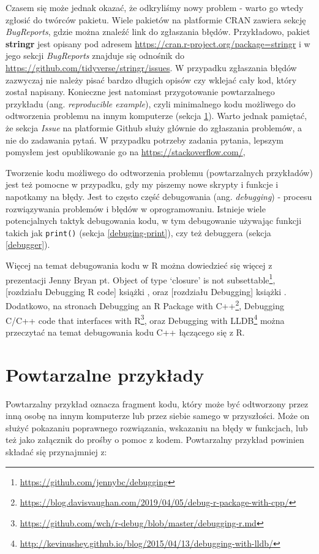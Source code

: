 \documentclass[paper=6in:9in,pagesize=pdftex,headinclude=on,footinclude=on,10pt]{scrbook}
\DeclareRobustCommand{\href}[2]{#2\footnote{\url{#1}}}
\begin{document}
Czasem się może jednak okazać, że odkryliśmy nowy problem - warto go wtedy zgłosić do twórców pakietu.
Wiele pakietów na platformie CRAN zawiera sekcję \emph{BugReports}, gdzie można znaleźć link do zgłaszania błędów.
Przykładowo, pakiet \textbf{stringr} jest opisany pod adresem \url{https://cran.r-project.org/package=stringr} i w jego sekcji \emph{BugReports} znajduje się odnośnik do \url{https://github.com/tidyverse/stringr/issues}.
W przypadku zgłaszania błędów zazwyczaj nie należy pisać bardzo długich opisów czy wklejać cały kod, który został napisany.
Konieczne jest natomiast przygotowanie powtarzalnego przykładu (ang. \emph{reproducible example}), czyli minimalnego kodu możliwego do odtworzenia problemu na innym komputerze (sekcja \ref{reprex}).
Warto jednak pamiętać, że sekcja \emph{Issue} na platformie Github służy głównie do zgłaszania problemów, a nie do zadawania pytań.
W przypadku potrzeby zadania pytania, lepszym pomysłem jest opublikowanie go na \url{https://stackoverflow.com/},

Tworzenie kodu możliwego do odtworzenia problemu (powtarzalnych przykładów) jest też pomocne w przypadku, gdy my piszemy nowe skrypty i funkcje i napotkamy na błędy.
Jest to często część debugowania (ang. \emph{debugging}) - procesu rozwiązywania problemów i błędów w oprogramowaniu.
Istnieje wiele potencjalnych taktyk debugowania kodu, w tym debugowanie używając funkcji takich jak \texttt{print()} (sekcja \ref{debuging-print}), czy też debuggera (sekcja \ref{debugger}).

Więcej na temat debugowania kodu w R można dowiedzieć się więcej z prezentacji Jenny Bryan pt. \href{https://github.com/jennybc/debugging}{Object of type `closure' is not subsettable}, {[}rozdziału Debugging R code{]} książki \citet{rstatswtf}, oraz {[}rozdziału Debugging{]} książki \citet{wickham2016r}.
Dodatkowo, na stronach \href{https://blog.davisvaughan.com/2019/04/05/debug-r-package-with-cpp/}{Debugging an R Package with C++}, \href{https://github.com/wch/r-debug/blob/master/debugging-r.md}{Debugging C/C++ code that interfaces with R}, oraz \href{http://kevinushey.github.io/blog/2015/04/13/debugging-with-lldb/}{Debugging with LLDB} można przeczytać na temat debugowania kodu C++ łączącego się z R.

\hypertarget{reprex}{%
\section{Powtarzalne przykłady}\label{reprex}}

Powtarzalny przykład oznacza fragment kodu, który może być odtworzony przez inną osobę na innym komputerze lub przez siebie samego w przyszłości.
Może on służyć pokazaniu poprawnego rozwiązania, wskazaniu na błędy w funkcjach, lub też jako załącznik do prośby o pomoc z kodem.
Powtarzalny przykład powinien składać się przynajmniej z:
\end{document}
